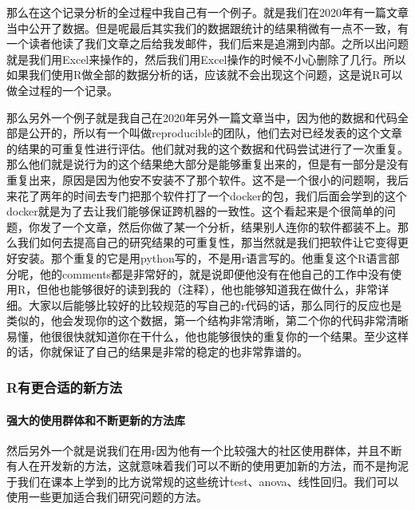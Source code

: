 \documentclass[
  oneside]{book}
\begin{document}
那么在这个记录分析的全过程中我自己有一个例子。就是我们在2020年有一篇文章当中公开了数据。但是呢最后其实我们的数据跟统计的结果稍微有一点不一致，有一个读者他读了我们文章之后给我发邮件，我们后来是追溯到内部。之所以出问题就是我们用Excel来操作的，然后我们用Excel操作的时候不小心删除了几行。所以如果我们使用R做全部的数据分析的话，应该就不会出现这个问题，这是说R可以做全过程的一个记录。

那么另外一个例子就是我自己在2020年另外一篇文章当中，因为他的数据和代码全部是公开的，所以有一个叫做reproducible的团队，他们去对已经发表的这个文章的结果的可重复性进行评估。他们就对我的这个数据和代码尝试进行了一次重复。那么他们就是说行为的这个结果绝大部分是能够重复出来的，但是有一部分是没有重复出来，原因是因为他安不安装不了那个软件。这不是一个很小的问题啊，我后来花了两年的时间去专门把那个软件打了一个docker的包，我们后面会学到的这个docker就是为了去让我们能够保证跨机器的一致性。这个看起来是个很简单的问题，你发了一个文章，然后你做了某一个分析，结果别人连你的软件都装不上。那么我们如何去提高自己的研究结果的可重复性，那当然就是我们把软件让它变得更好安装。那个重复的它是用python写的，不是用r语言写的。他重复这个R语言部分呢，他的comments都是非常好的，就是说即便他没有在他自己的工作中没有使用R，但他也能够很好的读到我的（注释），他也能够知道我在做什么，非常详细。大家以后能够比较好的比较规范的写自己的r代码的话，那么同行的反应也是类似的，他会发现你的这个数据，第一个结构非常清晰，第二个你的代码非常清晰易懂，他很很快就知道你在干什么，他也能够很快的重复你的一个结果。至少这样的话，你就保证了自己的结果是非常的稳定的也非常靠谱的。

\hypertarget{rux6709ux66f4ux5408ux9002ux7684ux65b0ux65b9ux6cd5}{%
\subsubsection{R有更合适的新方法}\label{rux6709ux66f4ux5408ux9002ux7684ux65b0ux65b9ux6cd5}}

\hypertarget{ux5f3aux5927ux7684ux4f7fux7528ux7fa4ux4f53ux548cux4e0dux65adux66f4ux65b0ux7684ux65b9ux6cd5ux5e93}{%
\paragraph{强大的使用群体和不断更新的方法库}\label{ux5f3aux5927ux7684ux4f7fux7528ux7fa4ux4f53ux548cux4e0dux65adux66f4ux65b0ux7684ux65b9ux6cd5ux5e93}}

然后另外一个就是说我们在用r因为他有一个比较强大的社区使用群体，并且不断有人在开发新的方法，这就意味着我们可以不断的使用更加新的方法，而不是拘泥于我们在课本上学到的比方说常规的这些统计test、anova、线性回归。我们可以使用一些更加适合我们研究问题的方法。
\end{document}
